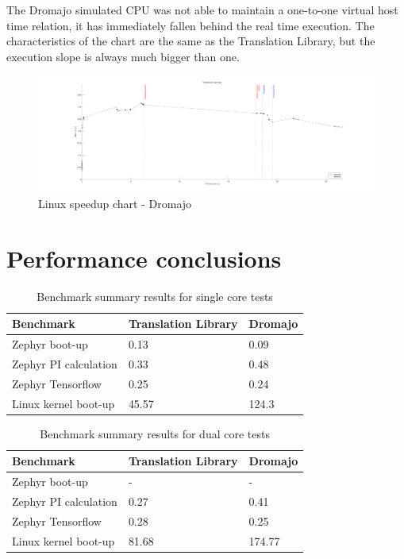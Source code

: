 \noindent
The Dromajo simulated CPU was not able to maintain a one-to-one virtual host time relation, it has immediately fallen
behind the real time execution. The characteristics of the chart are the same as the Translation Library, but the
execution slope is always much bigger than one.

\begin{figure}[h]
	\centering
    \hspace*{-2cm}
	\includegraphics[width=1.2\textwidth]{figures/benchmarks/linux_boot/adnotated/DromajoSpeedup.pdf}
	\caption{Linux speedup chart - Dromajo}
\end{figure}

\pagebreak

\section{Performance conclusions}

\begin{table}[h]
    \centering
    \begin{tabular}{l|l|l}
    Benchmark             & Translation Library & Dromajo  \\ \hline
    Zephyr boot-up        & 0.13                & 0.09     \\ \hline
    Zephyr PI calculation & 0.33                & 0.48     \\ \hline
    Zephyr Tensorflow     & 0.25                & 0.24     \\ \hline
    Linux kernel boot-up  & 45.57               & 124.3
    \end{tabular}
    \caption{Benchmark summary results for single core tests}
\end{table}

\begin{table}[h]
    \centering
    \begin{tabular}{l|l|l}
    Benchmark             & Translation Library & Dromajo  \\ \hline
    Zephyr boot-up        & -                   & -        \\ \hline
    Zephyr PI calculation & 0.27                & 0.41     \\ \hline
    Zephyr Tensorflow     & 0.28                & 0.25     \\ \hline
    Linux kernel boot-up  & 81.68               & 174.77
    \end{tabular}
    \caption{Benchmark summary results for dual core tests}
\end{table}

